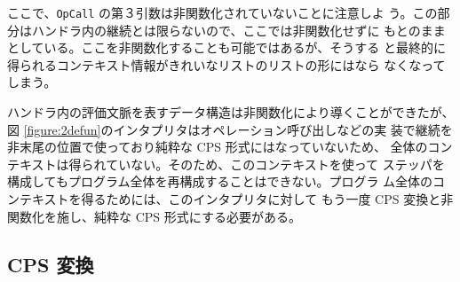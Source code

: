 ここで、\texttt{OpCall} の第３引数は非関数化されていないことに注意しよ
う。この部分はハンドラ内の継続とは限らないので、ここでは非関数化せずに
もとのままとしている。ここを非関数化することも可能ではあるが、そうする
と最終的に得られるコンテキスト情報がきれいなリストのリストの形にはなら
なくなってしまう。

ハンドラ内の評価文脈を表すデータ構造は非関数化により導くことができたが、
図 \ref{figure:2defun}のインタプリタはオペレーション呼び出しなどの実
装で継続を非末尾の位置で使っており純粋な CPS 形式にはなっていないため、
全体のコンテキストは得られていない。そのため、このコンテキストを使って
ステッパを構成してもプログラム全体を再構成することはできない。プログラ
ム全体のコンテキストを得るためには、このインタプリタに対して
もう一度 CPS 変換と非関数化を施し、純粋な CPS 形式にする必要がある。

\subsection{CPS 変換}
\label{subsection:3cps}

